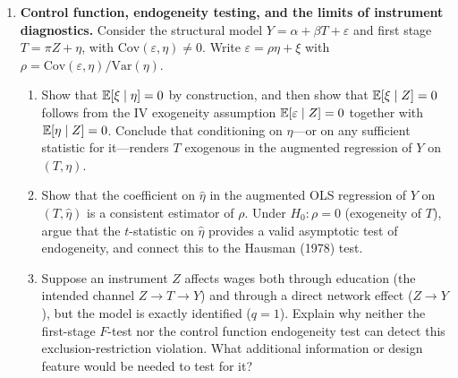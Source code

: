\documentclass[master.tex]{subfiles}
\begin{document}
\begin{enumerate}
\item \textbf{Control function, endogeneity testing, and the limits of
  instrument diagnostics.}
  Consider the structural model $Y = \alpha + \beta T + \varepsilon$
  and first stage $T = \pi Z + \eta$, with
  $\mathrm{Cov}(\varepsilon, \eta) \neq 0$.
  Write $\varepsilon = \rho\eta + \xi$ with
  $\rho = \mathrm{Cov}(\varepsilon,\eta)/\mathrm{Var}(\eta)$.
  \begin{enumerate}
    \item Show that $\mathbb{E}[\xi \mid \eta] = 0$ by construction, and
      then show that $\mathbb{E}[\xi \mid Z] = 0$ follows from the IV
      exogeneity assumption $\mathbb{E}[\varepsilon \mid Z] = 0$ together
      with $\mathbb{E}[\eta \mid Z] = 0$.  Conclude that conditioning on
      $\eta$---or on any sufficient statistic for it---renders $T$
      exogenous in the augmented regression of $Y$ on $(T, \eta)$.
    \item Show that the coefficient on $\hat\eta$ in the augmented
      OLS regression of $Y$ on $(T, \hat\eta)$ is a consistent
      estimator of $\rho$.  Under $H_0\colon\rho = 0$ (exogeneity
      of $T$), argue that the $t$-statistic on $\hat\eta$ provides a
      valid asymptotic test of endogeneity, and connect this to the
      Hausman (1978) test.
    \item Suppose an instrument $Z$ affects wages both through
      education (the intended channel $Z \to T \to Y$) and through
      a direct network effect ($Z \to Y$), but the model is exactly
      identified ($q = 1$).  Explain why neither the first-stage
      $F$-test nor the control function endogeneity test can detect
      this exclusion-restriction violation.  What additional
      information or design feature would be needed to test for
      it?
  \end{enumerate}

\end{enumerate}

\ifSubfilesClassLoaded{%
  
  
}{}
\end{document}
